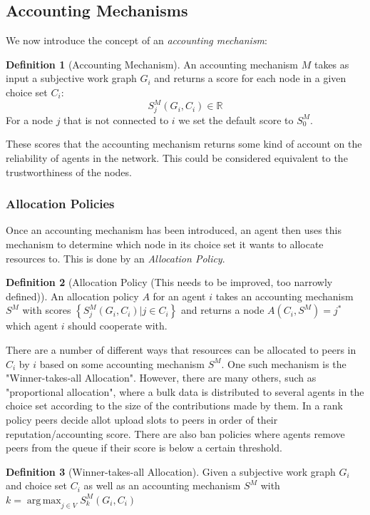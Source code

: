 \documentclass[11pt,a4paper]{report}
\theoremstyle{definition}
\newtheorem{definition}{Definition}[section]
\theoremstyle{theorem}
\theoremstyle{proposition}
\theoremstyle{corollary}
\theoremstyle{lemma}
\theoremstyle{example}
\theoremstyle{remark}
\DeclareMathOperator*{\argmax}{arg\,max}
\begin{document}
\subsection{Accounting Mechanisms}
\label{subsec:Accounting Mechanisms}
We now introduce the concept of an {\it accounting mechanism}:
\begin{definition}[Accounting Mechanism]
An accounting mechanism $M$ takes as input a subjective work graph $G_i$ and returns a score for each node in a given choice set $C_i$:
\[
S_j^M(G_i,C_i)\in\mathbb{R}
\]
For a node $j$ that is not connected to $i$ we set the default score to $S_0^M$. 
\end{definition}
These scores that the accounting mechanism returns some kind of account on the reliability of agents in the network. This could be considered equivalent to the trustworthiness of the nodes. 



\subsubsection{Allocation Policies}
\label{subsubsec:Allocation Policies}
Once an accounting mechanism has been introduced, an agent then uses this mechanism to determine which node in its choice set it wants to allocate resources to. This is done by an {\it Allocation Policy}.

\begin{definition}[Allocation Policy (This needs to be improved, too narrowly defined)]
An allocation policy $A$ for an agent $i$ takes an accounting mechanism $S^M$ with scores $\left\lbrace{}S_j^M(G_i,C_i)|j\in{}C_i\right\rbrace$ and returns a node $A(C_i,S^M)=j^{*}$ which agent $i$ should cooperate with.  
\end{definition}

There are a number of different ways that resources can be allocated to peers in $C_i$ by $i$ based on some accounting mechanism $S^M$. One such mechanism is the "Winner-takes-all Allocation". However, there are many others, such as "proportional allocation", where a bulk data is distributed to several agents in the choice set according to the size of the contributions made by them. In a rank policy peers decide allot upload slots to peers in order of their reputation/accounting score. There are also ban policies where agents remove peers from the queue if their score is below a certain threshold.  

\begin{definition}[Winner-takes-all Allocation]
Given a subjective work graph $G_i$ and choice set $C_i$ as well as an accounting mechanism $S^M$ with $k=\argmax_{j\in{}V}S_k^M(G_i,C_i)$
\end{definition}
\end{document}
